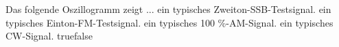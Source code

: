     {Das folgende Oszillogramm zeigt ...}
    {ein typisches Zweiton-SSB-Testsignal.}
    {ein typisches Einton-FM-Testsignal.}
    {ein typisches 100 \%-AM-Signal.}
    {ein typisches CW-Signal.}
    {true}{false}